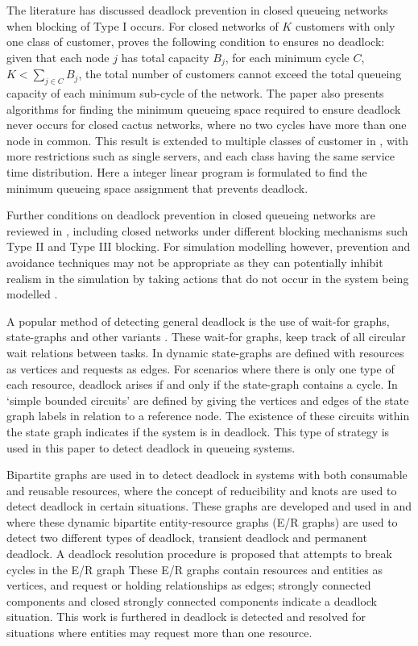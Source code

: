 \documentclass{article}
\numberwithin{equation}{section}
\begin{document}
The literature has discussed deadlock prevention in closed queueing networks when blocking of Type I occurs.
For closed networks of $K$ customers with only one class of customer, \cite{kunduakyildiz89} proves the following condition to ensures no deadlock: given that each node $j$ has total capacity $B_j$, for each minimum cycle $C$, $K < \sum_{j\in C} B_j$, the total number of customers cannot exceed the total queueing capacity of each minimum sub-cycle of the network.
The paper also presents algorithms for finding the minimum queueing space required to ensure deadlock never occurs for closed cactus networks, where no two cycles have more than one node in common.
This result is extended to multiple classes of customer in \cite{liebeherrakyildiz95}, with more restrictions such as single servers, and each class having the same service time distribution.
Here a integer linear program is formulated to find the minimum queueing space assignment that prevents deadlock.

Further conditions on deadlock prevention in closed queueing networks are reviewed in \cite{onvural90}, including closed networks under different blocking mechanisms such Type II and Type III blocking.
For simulation modelling however, prevention and avoidance techniques may not be appropriate as they can potentially inhibit realism in the simulation by taking actions that do not occur in the system being modelled \cite{venkateshetal98}.

A popular method of detecting general deadlock is the use of wait-for graphs, state-graphs and other variants \cite{cheng90, elmagarmid86, coffmanelphick71, choetal95, deuermeyeretal97, venkateshetal98, venkateshsmith03, venkateshsmith05, holt72}.
These wait-for graphs, keep track of all circular wait relations between tasks.
In \cite{coffmanelphick71} dynamic state-graphs are defined with resources as vertices and requests as edges.
For scenarios where there is only one type of each resource, deadlock arises if and only if the state-graph contains a cycle.
In \cite{choetal95} `simple bounded circuits' are defined by giving the vertices and edges of the state graph labels in relation to a reference node.
The existence of these circuits within the state graph indicates if the system is in deadlock.
This type of strategy is used in this paper to detect deadlock in queueing systems.

Bipartite graphs are used in \cite{holt72} to detect deadlock in systems with both consumable and reusable resources, where the concept of reducibility and knots are used to detect deadlock in certain situations.
These graphs are developed and used in \cite{deuermeyeretal97} and \cite{venkateshsmith03} where these dynamic bipartite entity-resource graphs (E/R graphs) are used to detect two different types of deadlock, transient deadlock and permanent deadlock. A deadlock resolution procedure is proposed that attempts to break cycles in the E/R graph
These E/R graphs contain resources and entities as vertices, and request or holding relationships as edges; strongly connected components and closed strongly connected components indicate a deadlock situation.
This work is furthered in \cite{venkateshetal98} deadlock is detected and resolved for situations where entities may request more than one resource.
\end{document}
